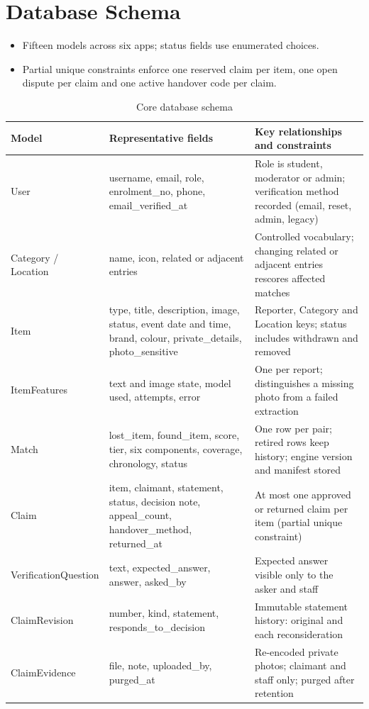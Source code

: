 \documentclass[12pt,a4paper,oneside]{report}
\begin{document}
\section{Database Schema}
\begin{itemize}
  \item Fifteen models across six apps; status fields use enumerated choices.
  \item Partial unique constraints enforce one reserved claim per item, one open dispute per claim and one active handover code per claim.
\end{itemize}
\begin{table}[H]
\centering\scriptsize
\caption{Core database schema}
\begin{tabularx}{\textwidth}{P{28mm}P{50mm}X}
\toprule
Model & Representative fields & Key relationships and constraints\\
\midrule
User & username, email, role, enrolment\_no, phone, email\_verified\_at & Role is student, moderator or admin; verification method recorded (email, reset, admin, legacy)\\
Category / Location & name, icon, related or adjacent entries & Controlled vocabulary; changing related or adjacent entries rescores affected matches\\
Item & type, title, description, image, status, event date and time, brand, colour, private\_details, photo\_sensitive & Reporter, Category and Location keys; status includes withdrawn and removed\\
ItemFeatures & text and image state, model used, attempts, error & One per report; distinguishes a missing photo from a failed extraction\\
Match & lost\_item, found\_item, score, tier, six components, coverage, chronology, status & One row per pair; retired rows keep history; engine version and manifest stored\\
Claim & item, claimant, statement, status, decision note, appeal\_count, handover\_method, returned\_at & At most one approved or returned claim per item (partial unique constraint)\\
VerificationQuestion & text, expected\_answer, answer, asked\_by & Expected answer visible only to the asker and staff\\
ClaimRevision & number, kind, statement, responds\_to\_decision & Immutable statement history: original and each reconsideration\\
ClaimEvidence & file, note, uploaded\_by, purged\_at & Re-encoded private photos; claimant and staff only; purged after retention\\

\end{tabularx}
\end{table}
\end{document}

